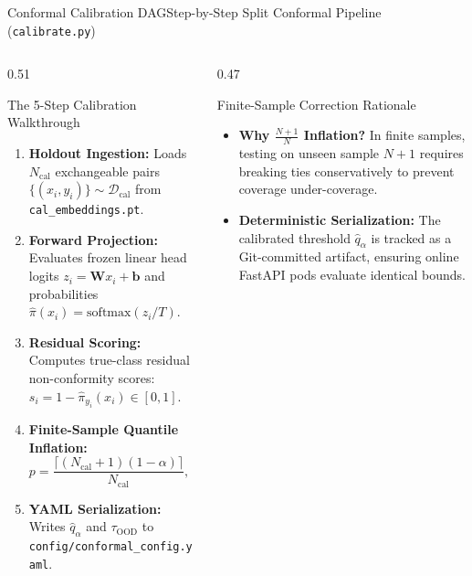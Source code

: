 \begin{frame}{Conformal Calibration DAG}{Step-by-Step Split Conformal Pipeline (\texttt{calibrate.py})}
    \vspace{-0.30cm}
    \begin{columns}[T]
        \begin{column}{0.51\textwidth}
            \begin{block}{The 5-Step Calibration Walkthrough}\scriptsize
                \begin{enumerate}\setlength{\itemsep}{1pt}
                    \item \textbf{Holdout Ingestion:} Loads $N_{\text{cal}}$ exchangeable pairs $\{(x_i, y_i)\} \sim \mathcal{D}_{\text{cal}}$ from \texttt{cal\_embeddings.pt}.
                    \item \textbf{Forward Projection:} Evaluates frozen linear head logits $z_i = \mathbf{W}x_i + \mathbf{b}$ and probabilities $\hat{\pi}(x_i) = \text{softmax}(z_i / T)$.
                    \item \textbf{Residual Scoring:} Computes true-class residual non-conformity scores: $s_i = 1 - \hat{\pi}_{y_i}(x_i) \in [0, 1]$.
                    \item \textbf{Finite-Sample Quantile Inflation:}
                    \[
                        p = \frac{\lceil(N_{\text{cal}} + 1)(1 - \alpha)\rceil}{N_{\text{cal}}}, \quad \hat{q}_\alpha = \text{Quantile}(\{s_i\}, p)
                    \]
                    \item \textbf{YAML Serialization:} Writes $\hat{q}_\alpha$ and $\tau_{\text{OOD}}$ to \texttt{config/conformal\_config.yaml}.
                \end{enumerate}
            \end{block}
        \end{column}
        \begin{column}{0.47\textwidth}
            \begin{block}{Finite-Sample Correction Rationale}\scriptsize
                \begin{itemize}\setlength{\itemsep}{2pt}
                    \item \textbf{Why $\frac{N+1}{N}$ Inflation?} In finite samples, testing on unseen sample $N+1$ requires breaking ties conservatively to prevent coverage under-coverage.
                    \item \textbf{Deterministic Serialization:} The calibrated threshold $\hat{q}_\alpha$ is tracked as a Git-committed artifact, ensuring online FastAPI pods evaluate identical bounds.

\end{itemize}
\end{block}
\end{column}
\end{columns}
\end{frame}

